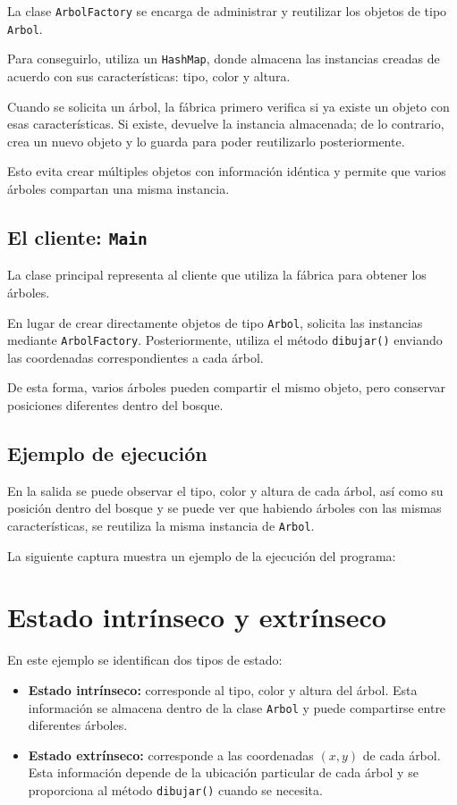 \documentclass{article}
\begin{document}
La clase \texttt{ArbolFactory} se encarga de administrar y reutilizar
los objetos de tipo \texttt{Arbol}.

Para conseguirlo, utiliza un \texttt{HashMap}, donde almacena las
instancias creadas de acuerdo con sus características: tipo, color y
altura.

Cuando se solicita un árbol, la fábrica primero verifica si ya existe
un objeto con esas características. Si existe, devuelve la instancia
almacenada; de lo contrario, crea un nuevo objeto y lo guarda para
poder reutilizarlo posteriormente.

Esto evita crear múltiples objetos con información idéntica y permite
que varios árboles compartan una misma instancia.

\subsection{El cliente: \texttt{Main}}

La clase principal representa al cliente que utiliza la fábrica para
obtener los árboles.

En lugar de crear directamente objetos de tipo \texttt{Arbol}, solicita
las instancias mediante \texttt{ArbolFactory}. Posteriormente, utiliza
el método \texttt{dibujar()} enviando las coordenadas correspondientes
a cada árbol.

De esta forma, varios árboles pueden compartir el mismo objeto,
pero conservar posiciones diferentes dentro del bosque.

\subsection{Ejemplo de ejecución}

En la salida se puede observar el tipo, color y altura
de cada árbol, así como su posición dentro del bosque y se puede ver que habiendo 
árboles con las mismas características, se reutiliza la misma instancia de \texttt{Arbol}.

La siguiente captura muestra un ejemplo de la ejecución del programa:


\section{Estado intrínseco y extrínseco}

En este ejemplo se identifican dos tipos de estado:

\begin{itemize}
    \item \textbf{Estado intrínseco:} corresponde al tipo, color y
    altura del árbol. Esta información se almacena dentro de la clase
    \texttt{Arbol} y puede compartirse entre diferentes árboles.

    \item \textbf{Estado extrínseco:} corresponde a las coordenadas
    $(x,y)$ de cada árbol. Esta información depende de la ubicación
    particular de cada árbol y se proporciona al método
    \texttt{dibujar()} cuando se necesita.
\end{itemize}
\end{document}
